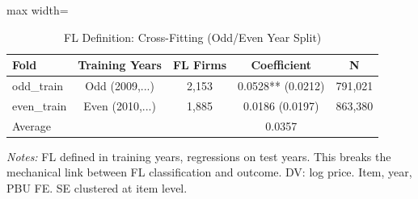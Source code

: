 \begin{table}[htbp]
\centering
\caption{FL Definition: Cross-Fitting (Odd/Even Year Split)}
\label{tab:fl_crossfit}
\begin{adjustbox}{max width=\textwidth}
\begin{threeparttable}
\small
\begin{tabular}{lcccc}
\toprule
Fold & Training Years & FL Firms & Coefficient & N \\
\midrule
odd\_train & Odd (2009,...) & 2,153 & 0.0528** (0.0212) & 791,021 \\
even\_train & Even (2010,...) & 1,885 & 0.0186 (0.0197) & 863,380 \\
\midrule
Average & & & 0.0357 & \\
\bottomrule
\end{tabular}
\begin{tablenotes}
\small
\item \textit{Notes:} FL defined in training years, regressions on test years.
This breaks the mechanical link between FL classification and outcome.
DV: log price. Item, year, PBU FE. SE clustered at item level.
\end{tablenotes}
\end{threeparttable}
\end{adjustbox}
\end{table}
